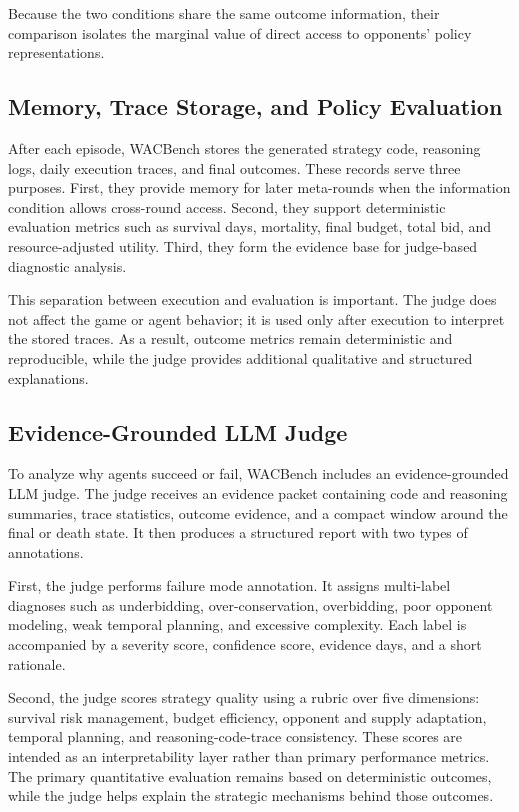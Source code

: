 \documentclass[letterpaper]{article} %
\begin{document}
Because the two conditions share the same outcome information,
their comparison isolates the marginal value of direct access
to opponents' policy representations.

\subsection{Memory, Trace Storage, and Policy Evaluation}

After each episode, WACBench stores the generated strategy code, reasoning logs, daily execution traces, and final outcomes. These records serve three purposes. First, they provide memory for later meta-rounds when the information condition allows cross-round access. Second, they support deterministic evaluation metrics such as survival days, mortality, final budget, total bid, and resource-adjusted utility. Third, they form the evidence base for judge-based diagnostic analysis.

This separation between execution and evaluation is important. The judge does not affect the game or agent behavior; it is used only after execution to interpret the stored traces. As a result, outcome metrics remain deterministic and reproducible, while the judge provides additional qualitative and structured explanations.

\subsection{Evidence-Grounded LLM Judge}

To analyze why agents succeed or fail, WACBench includes an evidence-grounded LLM judge. The judge receives an evidence packet containing code and reasoning summaries, trace statistics, outcome evidence, and a compact window around the final or death state. It then produces a structured report with two types of annotations.

First, the judge performs failure mode annotation. It assigns multi-label diagnoses such as underbidding, over-conservation, overbidding, poor opponent modeling, weak temporal planning, and excessive complexity. Each label is accompanied by a severity score, confidence score, evidence days, and a short rationale.

Second, the judge scores strategy quality using a rubric over five dimensions: survival risk management, budget efficiency, opponent and supply adaptation, temporal planning, and reasoning-code-trace consistency. These scores are intended as an interpretability layer rather than primary performance metrics. The primary quantitative evaluation remains based on deterministic outcomes, while the judge helps explain the strategic mechanisms behind those outcomes.
\end{document}
